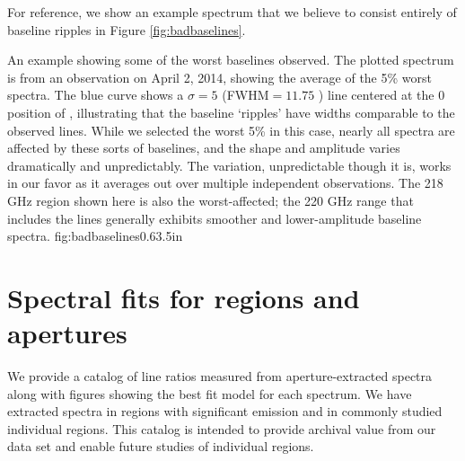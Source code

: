 For reference, we show an example spectrum that we believe to consist entirely
of baseline ripples in Figure \ref{fig:badbaselines}.

{An example showing some of the worst baselines observed.  The plotted spectrum
is from an observation on April 2, 2014, showing the average of the 5\% worst
spectra.  The blue curve shows a $\sigma=5$ \kms (FWHM$=11.75$ \kms) line centered
at the 0 \kms position of \para \threeohthree,
illustrating that the baseline `ripples' have widths comparable to the observed
lines.  While we selected the worst 5\% in this case, nearly all spectra are
affected by these sorts of baselines, and the shape and amplitude varies
dramatically and unpredictably.  The variation, unpredictable though it is,
works in our favor as it averages out over multiple independent observations.
The 218 GHz region shown here is also the worst-affected; the 220 GHz range
that includes the \thirteenco lines generally exhibits smoother and
lower-amplitude baseline spectra.}
{fig:badbaselines}{0.6}{3.5in}



\section{Spectral fits for regions and apertures}
We provide a catalog of line ratios measured from aperture-extracted spectra
along with figures showing the best fit model for each spectrum.  We have
extracted spectra in regions with significant \para emission and in commonly
studied individual regions.  This catalog is intended to provide archival value
from our data set and enable future studies of individual regions.


